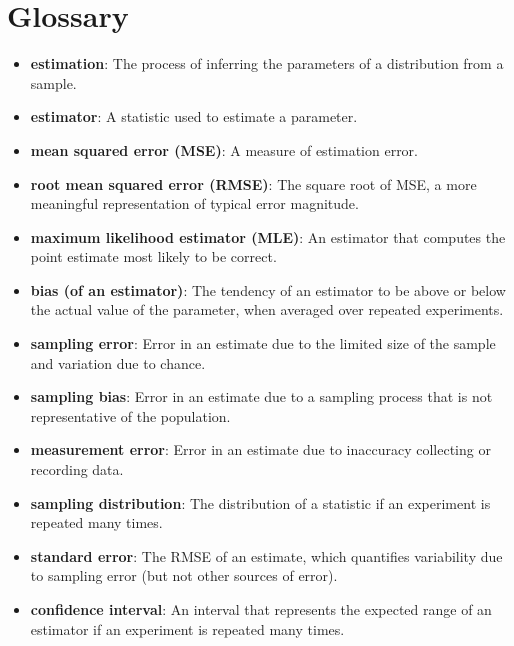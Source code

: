 \documentclass[12pt]{book}
\begin{document}
\section{Glossary}

\begin{itemize}

\item {\bf estimation}: The process of inferring the parameters of a distribution
from a sample.

\item {\bf estimator}: A statistic used to estimate a parameter.

\item {\bf mean squared error (MSE)}: A measure of estimation error.

\item {\bf root mean squared error (RMSE)}: The square root of MSE,
a more meaningful representation of typical error magnitude.

\item {\bf maximum likelihood estimator (MLE)}: An estimator that computes the
point estimate most likely to be correct.

\item {\bf bias (of an estimator)}: The tendency of an estimator to be above or
  below the actual value of the parameter, when averaged over repeated
  experiments.  

\item {\bf sampling error}: Error in an estimate due to the limited
  size of the sample and variation due to chance. 

\item {\bf sampling bias}: Error in an estimate due to a sampling process
  that is not representative of the population. 

\item {\bf measurement error}: Error in an estimate due to inaccuracy collecting
  or recording data. 

\item {\bf sampling distribution}: The distribution of a statistic if an
  experiment is repeated many times.  

\item {\bf standard error}: The RMSE of an estimate,
which quantifies variability due to sampling error (but not
other sources of error).

\item {\bf confidence interval}: An interval that represents the expected
  range of an estimator if an experiment is repeated many times.
   

\end{itemize}
\end{document}
